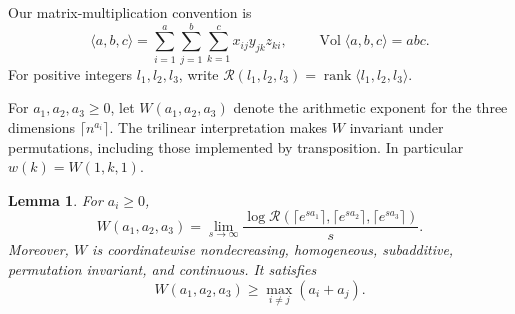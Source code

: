 \documentclass[11pt]{article}
\numberwithin{equation}{section}
\newtheorem{lemma}[theorem]{Lemma}
\theoremstyle{definition}
\theoremstyle{remark}
\begin{document}
Our matrix-multiplication convention is
\[
 \langle a,b,c\rangle
 =\sum_{i=1}^{a}\sum_{j=1}^{b}\sum_{k=1}^{c}x_{ij}y_{jk}z_{ki},
 \qquad \operatorname{Vol}\langle a,b,c\rangle=abc.
\]
For positive integers \(l_1,l_2,l_3\), write
\(\mathcal R(l_1,l_2,l_3)=\operatorname{rank}\langle l_1,l_2,l_3\rangle\).

For \(a_1,a_2,a_3\ge0\), let \(W(a_1,a_2,a_3)\) denote the arithmetic
exponent for the three dimensions \(\lceil n^{a_i}\rceil\).
The trilinear interpretation makes \(W\) invariant under permutations,
including those implemented by transposition.
In particular \(w(k)=W(1,k,1)\).

\begin{lemma}\label{lem:rank-exponent}
For \(a_i\ge0\),
\begin{equation}\label{eq:rank-exponent}
 W(a_1,a_2,a_3)=
 \lim_{s\to\infty}\frac{\log\mathcal R
   (\lceil e^{sa_1}\rceil,\lceil e^{sa_2}\rceil,
          \lceil e^{sa_3}\rceil)}{s}.
\end{equation}
Moreover, \(W\) is coordinatewise nondecreasing, homogeneous,
subadditive, permutation invariant, and continuous.  It satisfies
\[
 W(a_1,a_2,a_3)\ge\max_{i\ne j}(a_i+a_j).
\]
\end{lemma}
\end{document}
